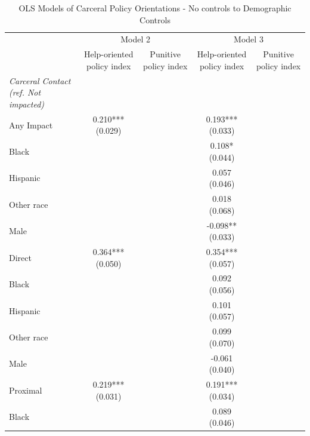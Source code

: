 \begin{table}[!htbp]
\centering
\caption{OLS Models of Carceral Policy Orientations - No controls to Demographic Controls}
\label{tab:carceral\_policy\_orientations\_nocontrol\_demo}
\begin{threeparttable}
\begin{tabular}{lcccc}
\toprule
 & \multicolumn{2}{c}{Model 2} & \multicolumn{2}{c}{Model 3}
 \\
\cmidrule(lr){2-3} \cmidrule(lr){4-5}
 & Help-oriented policy index & Punitive policy index & Help-oriented policy index & Punitive policy index
 \\
\midrule
\textit{Carceral Contact (ref. Not impacted)} &  &  &  & 
\\
Any Impact & \makecell[c]{0.210*** \\ (0.029)} &  & \makecell[c]{0.193*** \\ (0.033)} &  \\
Black &  &  & \makecell[c]{0.108* \\ (0.044)} &  \\
Hispanic &  &  & \makecell[c]{0.057 \\ (0.046)} &  \\
Other race &  &  & \makecell[c]{0.018 \\ (0.068)} &  \\
Male &  &  & \makecell[c]{-0.098** \\ (0.033)} &  \\
\addlinespace
Direct & \makecell[c]{0.364*** \\ (0.050)} &  & \makecell[c]{0.354*** \\ (0.057)} &  \\
Black &  &  & \makecell[c]{0.092 \\ (0.056)} &  \\
Hispanic &  &  & \makecell[c]{0.101 \\ (0.057)} &  \\
Other race &  &  & \makecell[c]{0.099 \\ (0.070)} &  \\
Male &  &  & \makecell[c]{-0.061 \\ (0.040)} &  \\
\addlinespace
Proximal & \makecell[c]{0.219*** \\ (0.031)} &  & \makecell[c]{0.191*** \\ (0.034)} &  \\
Black &  &  & \makecell[c]{0.089 \\ (0.046)} &  \\

\end{tabular}
\end{threeparttable}
\end{table}
